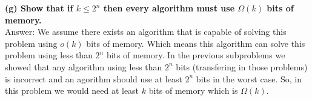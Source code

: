 \documentclass{article}
\begin{document}
\textbf{(g) Show that if $k\leq 2^n$ then every algorithm must use $\Omega(k)$ bits of memory.} \\ \newline
Answer: We assume there exists an algorithm that is capable of solving this problem using $o(k)$ bits of memory. Which means this algorithm can solve this problem using less than $2^n$ bits of memory. In the previous subproblems we showed that any algorithm using less than $2^n$ bits (transfering in those problems) is incorrect and an agorithm should use at least $2^n$ bits in the worst case. So, in this problem we would need at least $k$ bits of memory which is $\Omega(k)$. \\ \newline
\end{document}
